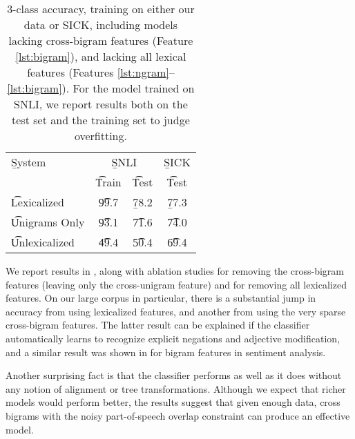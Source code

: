 \begin{table}
\begin{center}
\begin{tabular}{l@{\hskip \colspaceL}c@{\hskip \colspaceS}c@{\hskip \colspaceL}c}
\toprule
\b{System}	 & \multicolumn{2}{c}{\hspace{-1.2em}\b{SNLI}} & \b{SICK}\\
 & \t{Train} & \t{Test} & \t{Test}\\
\midrule
\t{Lexicalized}            & \t{99.7}  & \b{78.2} & \b{77.3} \\ %
\t{Unigrams Only}          & \t{93.1} & \t{71.6} & \t{74.0} \\ %
\t{Unlexicalized}          & \t{49.4} & \t{50.4} & \t{69.4}\\ %
\bottomrule
\end{tabular}
\end{center}
\caption{
\label{tab:bowresults}
3-class accuracy, training on either our data or SICK, including models lacking cross-bigram features 
  (Feature \ref{lst:bigram}), and lacking all lexical
  features (Features \ref{lst:ngram}--\ref{lst:bigram}). For the model trained on SNLI, we report results both on the test set and the training set to judge overfitting.
}
\end{table}
%
%


We report results in , along with ablation studies for removing
  the cross-bigram features (leaving only the cross-unigram feature)
  and for removing all lexicalized features.
On our large corpus in particular, there is a substantial jump in accuracy from using
  lexicalized features, and another from using the very sparse
  cross-bigram features.
The latter  result can be explained if
  the classifier automatically learns to recognize explicit negations and adjective
  modification, and a similar result was shown in
   for bigram features in sentiment analysis.
  
Another surprising fact is that the classifier performs as well as it
  does without any notion of alignment or tree transformations.
Although we expect that richer models would perform better,
  the results suggest that given enough data, cross bigrams with the noisy 
  part-of-speech overlap constraint can produce an effective model.

